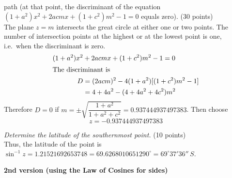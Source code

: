 \begin{description}
{  path (at that point, the discriminant of the equation
  $(1 + a^2)x^2 + 2acmx + (1 + c^2)m^2 - 1 = 0$ equals zero).}
  \hfill(30 points)\\
  The plane $z = m$ intersects the great circle at either one or two
  points. The number of intersection points at the highest or at the lowest
  point is one, i.e.\ when the discriminant is zero.
  \begin{align*}
  (1 + a^2)x^2 &+ 2acmx + (1 + c^2)m^2 - 1 = 0\\
  \intertext{The discriminant is}
  D &= (2acm)^2 - 4(1 + a^2)[(1 + c^2)m^2 - 1]\\
    &= 4 + 4a^2 - (4 + 4a^2 + 4c^2)m^2
  \end{align*}
  Therefore $D = 0$ if
  $m = \pm\sqrt{\dfrac{1 + a^2}{1 + a^2 + c^2}} = 0.937444937497383$. Then
  choose
  \[ z = -0.937444937497383 \]
\item[5.] \emph{Determine the latitude of the southernmost point.}
  \hfill(10 points)\\
  Thus, the latitude of the point is
  $\sin^{-1} z = 1.21521692653748 = 69.6268010651290^\circ
   = 69^\circ 37' 36''\,S$.
\end{description}

\textbf{2nd version (using the Law of Cosines for sides)}

